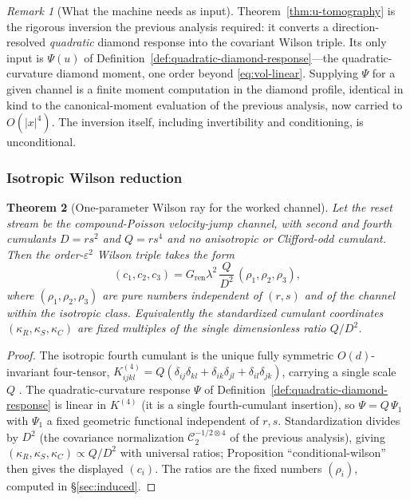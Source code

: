 \documentclass[11pt]{article}
\newtheorem{theorem}{Theorem}[section]
\theoremstyle{definition}
\theoremstyle{remark}
\newtheorem{remark}[theorem]{Remark}
\newcommand{\eps}{\varepsilon}
\newcommand{\Gren}{G_{\mathrm{ren}}}
\newcommand{\kR}{\kappa_R}
\newcommand{\kS}{\kappa_S}
\newcommand{\kC}{\kappa_C}
\begin{document}
\begin{remark}[What the machine needs as input]
\label{rem:machine-input}
Theorem~\ref{thm:u-tomography} is the rigorous inversion the previous analysis
required: it converts a direction-resolved \emph{quadratic} diamond response into
the covariant Wilson triple.  Its only input is $\Psi(u)$ of
Definition~\ref{def:quadratic-diamond-response}---the quadratic-curvature diamond moment,
one order beyond \eqref{eq:vol-linear}.  Supplying $\Psi$ for a given channel is a
finite moment computation in the diamond profile, identical in kind to the
canonical-moment evaluation of the previous analysis, now carried to $O(|x|^4)$.  The
inversion itself, including invertibility and conditioning, is unconditional.
\end{remark}

\subsubsection{Isotropic Wilson reduction}
\label{sec:isotropic}

\begin{theorem}[One-parameter Wilson ray for the worked channel]
\label{thm:one-param}
Let the reset stream be the compound-Poisson velocity-jump channel, with second and fourth cumulants $D=rs^2$ and $Q=rs^4$ and no anisotropic
or Clifford-odd cumulant.  Then the order-$\eps^2$ Wilson triple takes the form
\[
 (c_1,c_2,c_3)=\Gren\lambda^2\,\frac{Q}{D^2}\,(\rho_1,\rho_2,\rho_3),
\]
where $(\rho_1,\rho_2,\rho_3)$ are pure numbers independent of $(r,s)$ and of the
channel within the isotropic class.  Equivalently the standardized cumulant
coordinates $(\kR,\kS,\kC)$ are fixed multiples of the single dimensionless ratio
$Q/D^2$.
\end{theorem}

\begin{proof}
The isotropic fourth cumulant is the unique fully symmetric $O(d)$-invariant
four-tensor, $K^{(4)}_{ijkl}=Q(\delta_{ij}\delta_{kl}+\delta_{ik}\delta_{jl}
+\delta_{il}\delta_{jk})$, carrying a single scale $Q$
\cite{Isserlis}.  The quadratic-curvature response $\Psi$ of
Definition~\ref{def:quadratic-diamond-response} is linear in $K^{(4)}$ (it is a single
fourth-cumulant insertion), so $\Psi=Q\,\Psi_1$ with $\Psi_1$ a fixed geometric
functional independent of $r,s$.  Standardization divides by $D^2$
(the covariance normalization $\mathcal C_2^{-1/2\otimes4}$ of the previous analysis),
giving $(\kR,\kS,\kC)\propto Q/D^2$ with universal ratios; Proposition
``conditional-wilson'' then gives the displayed $(c_i)$.  The ratios are the
fixed numbers $(\rho_i)$, computed in \S\ref{sec:induced}.
\end{proof}
\end{document}
